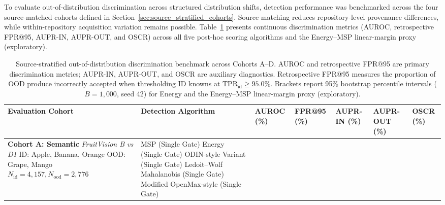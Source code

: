 To evaluate out-of-distribution discrimination across structured distribution shifts, detection performance was benchmarked across the four source-matched cohorts defined in Section~\ref{sec:source_stratified_cohorts}. Source matching reduces repository-level provenance differences, while within-repository acquisition variation remains possible. Table~\ref{tab:source_stratified_ood_results} presents continuous discrimination metrics (AUROC, retrospective FPR@95, AUPR-IN, AUPR-OUT, and OSCR) across all five post-hoc scoring algorithms and the Energy--MSP linear-margin proxy (exploratory).

\begin{table}[!t]
\caption{Source-stratified out-of-distribution discrimination benchmark across Cohorts A--D. AUROC and retrospective FPR@95 are primary discrimination metrics; AUPR-IN, AUPR-OUT, and OSCR are auxiliary diagnostics. Retrospective FPR@95 measures the proportion of OOD produce incorrectly accepted when thresholding ID knowns at $\text{TPR}_{\text{id}} \ge 95.0\%$. Brackets report 95\% bootstrap percentile intervals ($B = 1,000$, seed 42) for Energy and the Energy--MSP linear-margin proxy (exploratory).}
\label{tab:source_stratified_ood_results}
\centering
\scriptsize
\setlength{\tabcolsep}{2.5pt}
\begin{tabular}{>{\raggedright\arraybackslash}p{2.6cm} >{\raggedright\arraybackslash}p{3.2cm} >{\centering\arraybackslash}p{2.0cm} >{\centering\arraybackslash}p{1.8cm} >{\centering\arraybackslash}p{1.6cm} >{\centering\arraybackslash}p{1.6cm} >{\centering\arraybackslash}p{1.4cm}}
\toprule
\textbf{Evaluation Cohort} & \textbf{Detection Algorithm} & \textbf{AUROC (\%)} & \textbf{FPR@95 (\%)} & \textbf{AUPR-IN (\%)} & \textbf{AUPR-OUT (\%)} & \textbf{OSCR (\%)} \\
\midrule
\textbf{Cohort A: Semantic} \newline
\textit{FruitVision B vs D1} \newline
{\scriptsize ID: Apple, Banana, Orange} \newline
{\scriptsize OOD: Grape, Mango} \newline
{\scriptsize $N_{\text{id}} = 4,157, N_{\text{ood}} = 2,776$}
& MSP (Single Gate) \newline
Energy (Single Gate) \newline
ODIN-style Variant (Single Gate) \newline
Ledoit--Wolf Mahalanobis (Single Gate) \newline
Modified OpenMax-style (Single Gate) \newline

\end{tabular}
\end{table}
